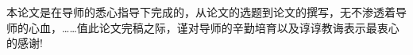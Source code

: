 \begin{thanks}
本论文是在导师的悉心指导下完成的，从论文的选题到论文的撰写，无不渗透着导师的心血，……值此论文完稿之际，谨对导师的辛勤培育以及谆谆教诲表示最衷心的感谢!
\end{thanks}
